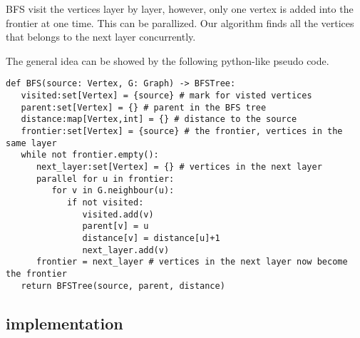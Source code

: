 \documentclass{article}
\begin{document}
BFS visit the vertices layer by layer, however, only one vertex is added into the frontier at one time.
This can be parallized. Our algorithm finds all the vertices that belongs to the next layer concurrently.

The general idea can be showed by the following python-like pseudo code.

\begin{verbatim}
def BFS(source: Vertex, G: Graph) -> BFSTree:
   visited:set[Vertex] = {source} # mark for visted vertices
   parent:set[Vertex] = {} # parent in the BFS tree
   distance:map[Vertex,int] = {} # distance to the source
   frontier:set[Vertex] = {source} # the frontier, vertices in the same layer
   while not frontier.empty():
      next_layer:set[Vertex] = {} # vertices in the next layer
      parallel for u in frontier:
         for v in G.neighbour(u):
            if not visited:
               visited.add(v)
               parent[v] = u
               distance[v] = distance[u]+1
               next_layer.add(v)
      frontier = next_layer # vertices in the next layer now become the frontier
   return BFSTree(source, parent, distance)
\end{verbatim}

\subsection{implementation}

\newcommand{\code}[1]{\texttt{#1}}
\end{document}
